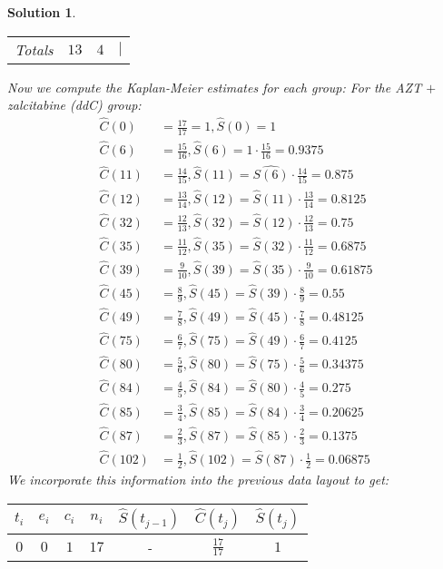 \documentclass[11pt]{article}
\newtheorem{sol}{Solution}
\begin{document}
\begin{sol}
\begin{tabular}{cccc}
		Totals& $13$& $4$& $|$\\
	\end{tabular}
	\vskip 2mm
	Now we compute the Kaplan-Meier estimates for each group:\vskip 2mm
	For the AZT $+$ zalcitabine (ddC) group:\vskip 2mm
	\begin{align*}
		\hat{C}(0) &= \frac{17}{17} = 1, \hat{S}(0) = 1\\
		\hat{C}(6) &= \frac{15}{16}, \hat{S}(6) = 1 \cdot \frac{15}{16}= 0.9375\\
		\hat{C}(11) &= \frac{14}{15}, \hat{S}(11) = \hat{S(6)}\cdot \frac{14}{15} = 0.875\\
		\hat{C}(12) &= \frac{13}{14}, \hat{S}(12) = \hat{S}(11)\cdot \frac{13}{14} = 0.8125\\
		\hat{C}(32) &= \frac{12}{13}, \hat{S}(32) = \hat{S}(12)\cdot \frac{12}{13} = 0.75\\
		\hat{C}(35) &= \frac{11}{12}, \hat{S}(35) = \hat{S}(32) \cdot \frac{11}{12} = 0.6875\\
		\hat{C}(39) &= \frac{9}{10}, \hat{S}(39) = \hat{S}(35) \cdot \frac{9}{10} = 0.61875\\
		\hat{C}(45) &= \frac{8}{9}, \hat{S}(45) = \hat{S}(39)\cdot \frac{8}{9} =0.55\\
		\hat{C}(49) &= \frac{7}{8}, \hat{S}(49) = \hat{S}(45)\cdot \frac{7}{8} = 0.48125\\
		\hat{C}(75) &= \frac{6}{7}, \hat{S}(75)= \hat{S}(49) \cdot \frac{6}{7} =  0.4125\\
		\hat{C}(80) &= \frac{5}{6}, \hat{S}(80) = \hat{S}(75)\cdot \frac{5}{6} = 0.34375\\
		\hat{C}(84) &= \frac{4}{5}, \hat{S}(84) = \hat{S}(80) \cdot \frac{4}{5} = 0.275\\
		\hat{C}(85) &= \frac{3}{4}, \hat{S}(85) = \hat{S}(84) \cdot \frac{3}{4} = 0.20625\\
		\hat{C}(87) &= \frac{2}{3}, \hat{S}(87) = \hat{S}(85) \cdot \frac{2}{3} = 0.1375\\
		\hat{C}(102) &= \frac{1}{2}, \hat{S}(102) = \hat{S}(87)\cdot \frac{1}{2} = 0.06875
	\end{align*}
	We incorporate this information into the previous data layout to get:\vskip 2mm
		\begin{center}
		\begin{tabular}{ccccccc}
		\hline
		$t_i$& $e_i$ & $c_i$ & $n_i$ & $\hat{S}(t_{j - 1})$ & $\hat{C}(t_{j })$ & $\hat{S}(t_j)$  \\
		\hline
		$0$& $0$ & $1$ & $17$& - & $\frac{17}{17}$ & $1$\\

\end{tabular}
\end{center}
\end{sol}
\end{document}
